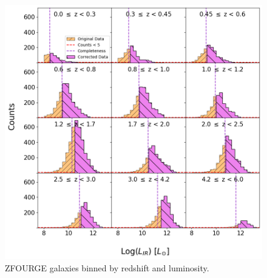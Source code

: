 \begin{figure}[t]
    \centering
    \includegraphics[width=\linewidth]{Figures/ZFOURGE Luminosity Binning.png}
    \caption{ZFOURGE galaxies binned by redshift and luminosity.}
    \label{Fig: ZFOURGE Binned}
\end{figure}

\lipsum[1-3]